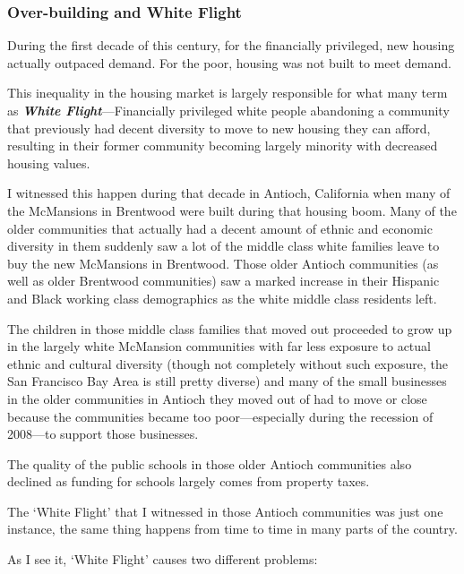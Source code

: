 \subsubsection{Over-building and White Flight}

During the first decade of this century, for the financially privileged, new housing actually outpaced demand. For the poor, housing was not built to meet demand.

This inequality in the housing market is largely responsible for what many term as \textbf{\textit{White Flight}}---Financially privileged white people abandoning a community that previously had decent diversity to move to new housing they can afford, resulting in their former community becoming largely minority with decreased housing values.

I witnessed this happen during that decade in Antioch, California when many of the McMansions in Brentwood were built during that housing boom. Many of the older communities that actually had a decent amount of ethnic and economic diversity in them suddenly saw a lot of the middle class white families leave to buy the new McMansions in Brentwood. Those older Antioch communities (as well as older Brentwood communities) saw a marked increase in their Hispanic and Black working class demographics as the white middle class residents left.

The children in those middle class families that moved out proceeded to grow up in the largely white McMansion communities with far less exposure to actual ethnic and cultural diversity (though not completely without such exposure, the San Francisco Bay Area is still pretty diverse) and many of the small businesses in the older communities in Antioch they moved out of had to move or close because the communities became too poor---especially during the recession of 2008---to support those businesses.

The quality of the public schools in those older Antioch communities also declined as funding for schools largely comes from property taxes.

The `White Flight' that I witnessed in those Antioch communities was just one instance, the same thing happens from time to time in many parts of the country.

As I see it, `White Flight' causes two different problems:

